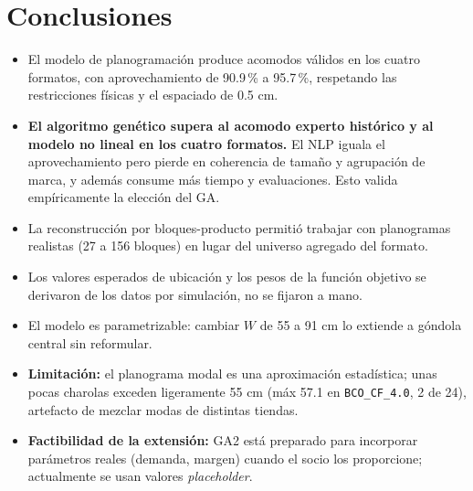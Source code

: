 \documentclass[11pt,letterpaper]{article}
\begin{document}
\section{Conclusiones}
\begin{itemize}[leftmargin=1.6em, itemsep=0.3em]
\item El modelo de planogramaci\'on produce acomodos v\'alidos en los cuatro formatos,
con aprovechamiento de 90.9\,\% a 95.7\,\%, respetando las restricciones f\'isicas y
el espaciado de 0.5 cm.
\item \textbf{El algoritmo gen\'etico supera al acomodo experto hist\'orico y al
modelo no lineal en los cuatro formatos.} El NLP iguala el aprovechamiento pero pierde
en coherencia de tama\~no y agrupaci\'on de marca, y adem\'as consume m\'as tiempo y
evaluaciones. Esto valida emp\'iricamente la elecci\'on del GA.
\item La reconstrucci\'on por bloques-producto permiti\'o trabajar con planogramas
realistas (27 a 156 bloques) en lugar del universo agregado del formato.
\item Los valores esperados de ubicaci\'on y los pesos de la funci\'on objetivo se
derivaron de los datos por simulaci\'on, no se fijaron a mano.
\item El modelo es parametrizable: cambiar $W$ de 55 a 91 cm lo extiende a g\'ondola
central sin reformular.
\item \textbf{Limitaci\'on:} el planograma modal es una aproximaci\'on estad\'istica;
unas pocas charolas exceden ligeramente 55 cm (m\'ax 57.1 en \texttt{BCO\_CF\_4.0},
2 de 24), artefacto de mezclar modas de distintas tiendas.
\item \textbf{Factibilidad de la extensi\'on:} GA2 est\'a preparado para incorporar
par\'ametros reales (demanda, margen) cuando el socio los proporcione; actualmente se
usan valores \emph{placeholder}.
\end{itemize}

\end{document}
